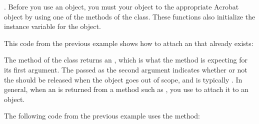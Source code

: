 \documentclass[letterpaper,12pt,english,openany,oneside]{sphinxmanual}
\begin{document}
 . Before you use an object, you must  your object to the appropriate Acrobat object by using one of the  methods of the  class. These functions also initialize the  instance variable for the object.

This code from the previous example shows how to attach an  that already exists:

\begin{sphinxVerbatim}[commandchars=\\\{\}]
 

   

 
\end{sphinxVerbatim}

The  method of the  class returns an , which is what the  method is expecting for its first argument. The  passed as the second argument indicates whether or not the  should be released when the object goes out of scope, and is typically . In general, when an  is returned from a method such as , you use  to attach it to an object.

The following code from the previous example uses the  method:

\begin{sphinxVerbatim}[commandchars=\\\{\}]
    
 
\end{sphinxVerbatim}
\end{document}
